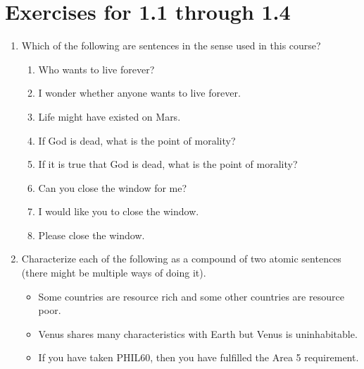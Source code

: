 \section*{Exercises for 1.1 through 1.4}

\begin{enumerate}

 \item Which of the following are sentences in the sense used in this course?

  \begin{enumerate}

   \item Who wants to live forever?

   \item I wonder whether anyone wants to live forever.

   \item Life might have existed on Mars.

   \item If God is dead, what is the point of morality?

   \item If it is true that God is dead, what is the point of morality?

   \item Can you close the window for me?

   \item I would like you to close the window.

   \item Please close the window.

  \end{enumerate}

 \item Characterize each of the following as a compound of two atomic sentences 
  (there might be multiple ways of doing it).

  \begin{itemize}

   \item Some countries are resource rich and some other countries are resource 
	poor.

   \item Venus shares many characteristics with Earth but Venus is 
	uninhabitable.

   \item If you have taken PHIL60, then you have fulfilled the Area 5 
	requirement.


\end{itemize}
\end{enumerate}
